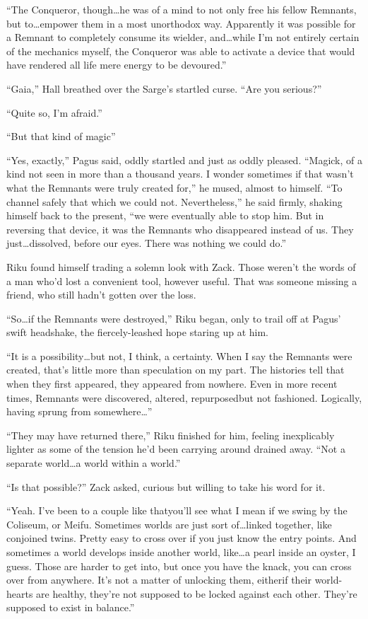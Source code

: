 ``The Conqueror, though\ldots he was of a mind to not only free his fellow Remnants, but to\ldots empower them in a most unorthodox way. Apparently it was possible for a Remnant to completely consume its wielder, and\ldots while I'm not entirely certain of the mechanics myself, the Conqueror was able to activate a device that would have rendered all life mere energy to be devoured.''

``Gaia,'' Hall breathed over the Sarge's startled curse. ``Are you serious?''

``Quite so, I'm afraid.''

``But that kind of magic\textemdash ''

``Yes, exactly,'' Pagus said, oddly startled and just as oddly pleased. ``Magick, of a kind not seen in more than a thousand years. I wonder sometimes if that wasn't what the Remnants were truly created for,'' he mused, almost to himself. ``To channel safely that which we could not. Nevertheless,'' he said firmly, shaking himself back to the present, ``we were eventually able to stop him. But in reversing that device, it was the Remnants who disappeared instead of us. They just\ldots dissolved, before our eyes. There was nothing we could do.''

Riku found himself trading a solemn look with Zack. Those weren't the words of a man who'd lost a convenient tool, however useful. That was someone missing a friend, who still hadn't gotten over the loss.

``So\ldots if the Remnants were destroyed,'' Riku began, only to trail off at Pagus' swift headshake, the fiercely-leashed hope staring up at him.

``It is a possibility\ldots but not, I think, a certainty. When I say the Remnants were created, that's little more than speculation on my part. The histories tell that when they first appeared, they appeared from nowhere. Even in more recent times, Remnants were discovered, altered, repurposed\textemdash but not fashioned. Logically, having sprung from somewhere\ldots ''

``They may have returned there,'' Riku finished for him, feeling inexplicably lighter as some of the tension he'd been carrying around drained away. ``Not a separate world\ldots a world within a world.''

``Is that possible?'' Zack asked, curious but willing to take his word for it.

``Yeah. I've been to a couple like that\textemdash you'll see what I mean if we swing by the Coliseum, or Meifu. Sometimes worlds are just sort of\ldots linked together, like conjoined twins. Pretty easy to cross over if you just know the entry points. And sometimes a world develops inside another world, like\ldots a pearl inside an oyster, I guess. Those are harder to get into, but once you have the knack, you can cross over from anywhere. It's not a matter of unlocking them, either\textemdash if their world-hearts are healthy, they're not supposed to be locked against each other. They're supposed to exist in balance.''

